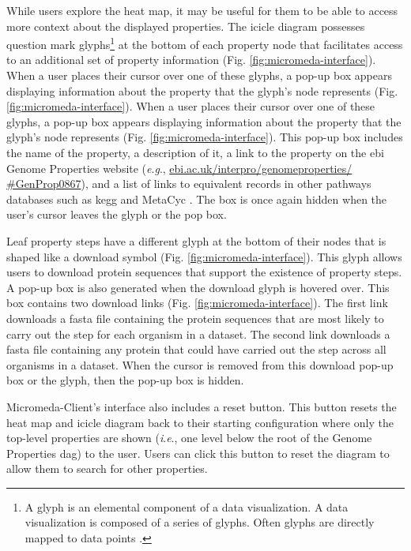 While users explore the heat map, it may be useful for them to be able to access 
more context about the displayed properties. The icicle diagram possesses 
question mark glyphs\footnote{A glyph is an elemental component of a data 
visualization. A data visualization is composed of a series of glyphs. Often 
glyphs are directly mapped to data points \cite{chen}.} at the bottom of each 
property node that facilitates access to an additional set of property 
information (Fig. \ref{fig:micromeda-interface}). When a user places their 
cursor over one of these glyphs, a pop-up box appears displaying information 
about the property that the glyph's node represents (Fig. 
\ref{fig:micromeda-interface}). When a user places their cursor over one of 
these glyphs, a pop-up box appears displaying information about the property 
that the glyph's node represents (Fig. \ref{fig:micromeda-interface}). This 
pop-up box includes the name of the property, a description of it, a link to the 
property on the \gls{ebi}  Genome Properties website (\textit{e}.\textit{g}., 
\href{https://www.ebi.ac.uk/interpro/genomeproperties/#GenProp0867}{ebi.ac.uk/interpro/genomeproperties/ 
\#GenProp0867}), and a list of links to equivalent records in other pathways 
databases such as \gls{kegg} \cite{kanehisa2000kegg} and MetaCyc 
\cite{karp2002metacyc}. The box is once again hidden when the user's cursor 
leaves the glyph or the pop box.

Leaf property steps have a different glyph at the bottom of their nodes that is 
shaped like a download symbol (Fig. \ref{fig:micromeda-interface}). This glyph 
allows users to download protein sequences that support the existence of 
property steps. A pop-up box is also generated when the download glyph is 
hovered over. This box contains two download links (Fig. 
\ref{fig:micromeda-interface}). The first link downloads a \gls{fasta} file 
containing the protein sequences that are most likely to carry out the step for 
each organism in a dataset. The second link downloads a \gls{fasta} file 
containing any protein that could have carried out the step across all organisms 
in a dataset. When the cursor is removed from this download pop-up box or the 
glyph, then the pop-up box is hidden.

Micromeda-Client's interface also includes a reset button. This button resets 
the heat map and icicle diagram back to their starting configuration where only 
the top-level properties are shown (\textit{i}.\textit{e}., one level below the root of the Genome 
Properties \gls{dag}) to the user. Users can click this button to reset the 
diagram to allow them to search for other properties.

